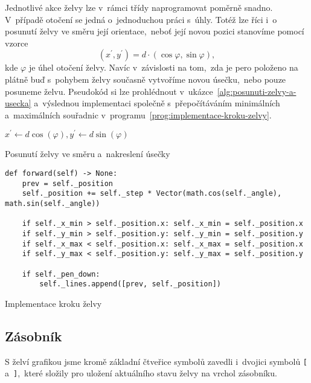 Jednotlivé akce želvy lze v~rámci třídy naprogramovat poměrně snadno. V~případě otočení se jedná o~jednoduchou práci s~úhly. Totéž lze říci i~o posunutí želvy ve směru její orientace,~neboť její novou pozici stanovíme pomocí vzorce
\[(x^\prime,y^\prime)=d\cdot(\cos\varphi,\sin\varphi),\]
kde $\varphi$ je úhel otočení želvy. Navíc v~závislosti na tom,~zda je pero položeno na plátně buď s~pohybem želvy současně vytvoříme novou úsečku,~nebo pouze posuneme želvu. Pseudokód si lze prohlédnout v~ukázce~\ref{alg:posunuti-zelvy-a-usecka} a~výslednou implementaci společně s~přepočítáváním minimálních a~maximálních souřadnic v~programu~\ref{prog:implementace-kroku-zelvy}.
\begin{algorithm}[h]
    $x^\prime\gets d\cos(\varphi),y^\prime\gets d\sin(\varphi)$\;
    \;
    \caption{Posunutí želvy ve směru a~nakreslení úsečky}
    \label{alg:posunuti-zelvy-a-usecka}
\end{algorithm}
\begin{program}[h]
\begin{lstlisting}[style=python]
def forward(self) -> None:
    prev = self._position
    self._position += self._step * Vector(math.cos(self._angle), math.sin(self._angle))

    if self._x_min > self._position.x: self._x_min = self._position.x
    if self._y_min > self._position.y: self._y_min = self._position.y
    if self._x_max < self._position.x: self._x_max = self._position.x
    if self._y_max < self._position.y: self._y_max = self._position.y

    if self._pen_down:
        self._lines.append([prev, self._position])
\end{lstlisting}
    \caption{Implementace kroku želvy}
    \label{prog:implementace-kroku-zelvy}
\end{program}

\subsection{Zásobník}\label{subsec:zasobnik}

S želví grafikou jsme kromě základní čtveřice symbolů zavedli i~dvojici symbolů \texttt{[} a~\texttt{]},~které složily pro uložení aktuálního stavu želvy na vrchol zásobníku.

